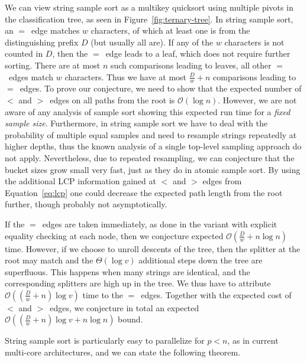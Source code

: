 \documentclass[a4paper]{myjournal}
\newcommand{\Oh}[1]{\mathcal{O}\!\left( #1\right)}
\newcommand{\Th}[1]{\Theta\!\left( #1\right)}
\def\Oh#1{\mathcal{O}(#1)}
\begin{document}
We can view string sample sort as a multikey quicksort using multiple pivots in
the classification tree, as seen in Figure~\ref{fig:ternary-tree}.  In string
sample sort, an $=$~edge matches $w$ characters, of which at least one is from
the distinguishing prefix $D$ (but usually all are). If any of the $w$
characters is not counted in $D$, then the $=$~edge leads to a leaf, which does
not require further sorting. There are at most $n$ such comparisons leading to
leaves, all other $=$~edges match $w$ characters. Thus we have at most
$\frac{D}{w} + n$ comparisons leading to $=$~edges.  To prove our conjecture, we
need to show that the expected number of $<$ and $>$~edges on all paths from the
root is $\Oh{\log n}$.  However, we are not aware of any analysis of sample sort
showing this expected run time for a \emph{fixed sample size}. Furthermore, in
string sample sort we have to deal with the probability of multiple equal
samples and need to resample strings repeatedly at higher depths, thus the known
analysis of a single top-level sampling approach
\cite{blelloch1991comparison,yang1987optimal,frazer1970samplesort} do not
apply. Nevertheless, due to repeated resampling, we can conjecture that the
bucket sizes grow small very fast, just as they do in atomic sample sort.  By
using the additional LCP information gained at $<$ and $>$ edges from
Equation~\ref{eq:lcp} one could decrease the expected path length from the root
further, though probably not asymptotically.

If the $=$~edges are taken immediately, as done in the variant with explicit
equality checking at each node, then we conjecture expected $\Oh{\frac{D}{w} + n
  \log n}$ time.  However, if we choose to unroll descents of the tree, then the
splitter at the root may match and the $\Th{\log v}$ additional steps down the
tree are superfluous.  This happens when many strings are identical, and the
corresponding splitters are high up in the tree. We thus have to attribute
$\Oh{(\frac{D}{w} + n) \log v}$ time to the $=$~edges. Together with the
expected cost of $<$ and $>$~edges, we conjecture in total an expected
$\Oh{(\frac{D}{w} + n) \log v + n \log n}$ bound.

String sample sort is particularly easy to parallelize for $p < n$, as in
current multi-core architectures, and we can state the following theorem.
\end{document}
